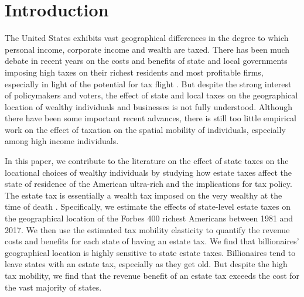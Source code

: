 \documentclass[12pt]{article}
\begin{document}
\thispagestyle{empty}


 
\newpage

\setcounter{page}{1}

\section{Introduction}

The United States exhibits vast geographical differences in the degree to which personal income, corporate income and wealth  are taxed. 
There has been much debate in recent years on the costs and benefits of state and local governments imposing high taxes on their richest residents and most profitable firms, especially in light of the potential for tax flight \citep{moretti/wilson:2017,klevenJEP,zidar}.
But despite the strong interest of policymakers and voters, the effect of state and local taxes on
the geographical location of wealthy individuals and businesses is not fully  understood. Although there have been some important recent advances,  there is still too little empirical work on the effect of taxation on the spatial mobility of individuals, especially among high income individuals. 

In this paper, we contribute to the literature on the  effect of state taxes on
the  locational choices  of wealthy individuals by studying how estate taxes affect the state of residence of the American ultra-rich and the implications for tax policy.
The estate tax is essentially a wealth tax imposed on the very wealthy at the time of death \citep{wo3}.  Specifically, we estimate the effects of state-level estate taxes on the geographical location of the Forbes 400 richest Americans between 1981 and 2017. 
We then use the estimated tax mobility elasticity  to quantify the revenue costs and benefits for each state of having an estate tax. 
We find that billionaires' geographical location is highly sensitive to state estate taxes. Billionaires tend to leave states with an estate tax, especially as they get old.   
But despite the high  tax mobility, we find that  the revenue benefit of an estate tax exceeds the cost for the vast majority of states. 
\end{document}
